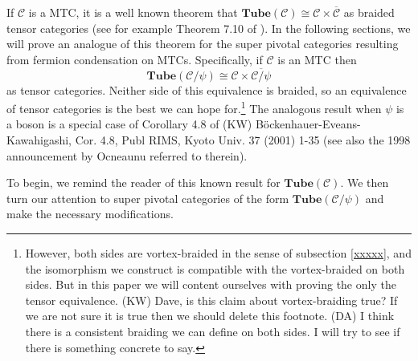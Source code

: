 \documentclass[12pt,a4paper]{article}
\newcommand{\tp}{\otimes}
\newcommand{\mcc}{\mathcal{C}}
\newcommand\be            {\begin{equation}}
\newcommand\ee            {\end{equation}}
\newcommand{\tube}{\textbf{Tube}}
\newcommand{\kw}[1]{{\color{kwcolor}\footnotesize{(KW) #1}}}
\newcommand{\dave}[1]{{\color{ao(english)}\footnotesize{(DA) #1}}}
\begin{document}
If $\mcc$ is a MTC, it is a well known theorem that $\tube(\mcc) \cong \mcc \times \overline{\mcc}$ as braided tensor categories
(see for example Theorem 7.10 of \cite{muger2003b}). 
In the following sections, we will prove an analogue of this theorem for the super pivotal categories resulting from fermion condensation on MTCs.
Specifically, if $\mcc$ is an MTC then
\be \label{tube_theorem_teaser}
	\tube(\mcc/\psi) \cong \mcc \times \overline{\mcc/\psi}
\ee 
as tensor categories.
Neither side of this equivalence is braided, so an equivalence of tensor categories is the best we can hope for.\footnote{However, 
both sides are vortex-braided in the sense of subsection \ref{xxxxx}, and the isomorphism we construct
is compatible with the vortex-braided on both sides.
But in this paper we will content ourselves with proving the only the tensor equivalence.
\kw{Dave, is this claim about vortex-braiding true?
If we are not sure it is true then we should delete this footnote.}
\dave{I think there is a consistent braiding we can define on both sides.
I will try to see if there is something concrete to say.}
}
The analogous result when $\psi$ is a boson is a special case of Corollary 4.8 of \cite{kawahigashi2001}
\kw{B\"ockenhauer-Eveans-Kawahigashi, Cor. 4.8, Publ RIMS, Kyoto Univ. 37 (2001) 1-35}
(see also the 1998 announcement by Ocneaunu referred to therein).

To begin, we remind the reader of this known result for $\tube(\mcc)$.
We then turn our attention to super pivotal categories of the form $\tube(\mcc/\psi)$ and make the necessary modifications.
\end{document}
